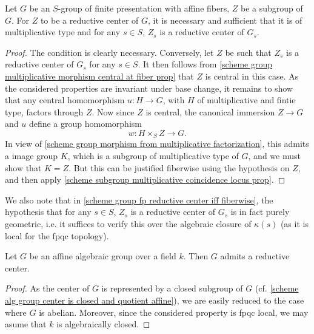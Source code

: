 \begin{proposition}\label{scheme group fp reductive center iff fiberwise}
Let $G$ be an $S$-group of finite presentation with affine fibers, $Z$ be a subgroup of $G$. For $Z$ to be a reductive center of $G$, it is necessary and sufficient that it is of multiplicative type and for any $s\in S$, $Z_s$ is a reductive center of $G_s$.
\end{proposition}
\begin{proof}
The condition is clearly necessary. Conversely, let $Z$ be such that $Z_s$ is a reductive center of $G_s$ for any $s\in S$. It then follows from \cref{scheme group multiplicative morphism central at fiber prop} that $Z$ is central in this case. As the considered properties are invariant under base change, it remains to show that any central homomorphism $u:H\to G$, with $H$ of multiplicative and fintie type, factors through $Z$. Now since $Z$ is central, the canonical immersion $Z\to G$ and $u$ define a group homomorphism
\[w:H\times_SZ\to G.\]
In view of \cref{scheme group morphism from multiplicative factorization}, this admits a image group $K$, which is a subgroup of multiplicative type of $G$, and we must show that $K=Z$. But this can be justified fiberwise using the hypothesis on $Z$, and then apply \cref{scheme subgroup multiplicative coincidence locus prop}.
\end{proof}

We also note that in \cref{scheme group fp reductive center iff fiberwise}, the hypothesis that for any $s\in S$, $Z_s$ is a reductive center of $G_s$ is in fact purely geometric, i.e. it suffices to verify this over the algebraic closure of $\kappa(s)$ (as it is local for the fpqc topology).

\begin{theorem}\label{scheme alg group affine reductive center exist}
Let $G$ be an affine algebraic group over a field $k$. Then $G$ admits a reductive center.
\end{theorem}
\begin{proof}
As the center of $G$ is represented by a closed subgroup of $G$ (cf. \cref{scheme alg group center is closed and quotient affine}), we are easily reduced to the case where $G$ is abelian. Moreover, since the considered property is fpqc local, we may asume that $k$ is algebraically closed. 
\end{proof}

